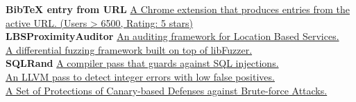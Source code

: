 
\begin{cvparagraph}

\textbf{BibTeX entry from URL} \hspace*{2pt} \href{https://chrome.google.com/webstore/detail/bibtex-entry-from-url/mgpmgkhhbjgkpnanlmlhibjfgpdpgjec} {A Chrome extension that produces  entries from the active URL. (Users > 6500, Rating: 5 stars)}\\
\textbf{LBSProximityAuditor} \hspace*{7pt} \href{https://github.com/nettrino/LBSProximityAuditor}{An auditing framework for Location Based Services.}\\
\textbf{\nezha} \hspace*{69pt} \href{https://github.com/nezha-dt/nezha}
    {A differential fuzzing framework built on top of libFuzzer.}\\
\textbf{SQLRand} \hspace*{58pt}
\href{https://github.com/nettrino/SQLRand}{A compiler pass that guards against SQL injections.}\\
\textbf{\intflow} \hspace*{59pt} \href{https://github.com/nettrino/IntFlow}{An LLVM pass to detect integer errors with low false positives.}\\
\textbf{\dynaguard} \hspace*{46pt}
\href{https://github.com/nettrino/DynaGuard}{A Set of Protections of Canary-based Defenses against Brute-force Attacks.}
\end{cvparagraph}
